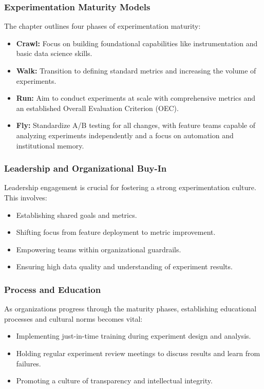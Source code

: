\documentclass{article}
\begin{document}
\subsubsection*{Experimentation Maturity Models}
The chapter outlines four phases of experimentation maturity:
\begin{itemize}
    \item \textbf{Crawl:} Focus on building foundational capabilities like instrumentation and basic data science skills.
    \item \textbf{Walk:} Transition to defining standard metrics and increasing the volume of experiments.
    \item \textbf{Run:} Aim to conduct experiments at scale with comprehensive metrics and an established Overall Evaluation Criterion (OEC).
    \item \textbf{Fly:} Standardize A/B testing for all changes, with feature teams capable of analyzing experiments independently and a focus on automation and institutional memory.
\end{itemize}

\subsubsection*{Leadership and Organizational Buy-In}
Leadership engagement is crucial for fostering a strong experimentation culture. This involves:
\begin{itemize}
    \item Establishing shared goals and metrics.
    \item Shifting focus from feature deployment to metric improvement.
    \item Empowering teams within organizational guardrails.
    \item Ensuring high data quality and understanding of experiment results.
\end{itemize}

\subsubsection*{Process and Education}
As organizations progress through the maturity phases, establishing educational processes and cultural norms becomes vital:
\begin{itemize}
    \item Implementing just-in-time training during experiment design and analysis.
    \item Holding regular experiment review meetings to discuss results and learn from failures.
    \item Promoting a culture of transparency and intellectual integrity.
\end{itemize}
\end{document}
